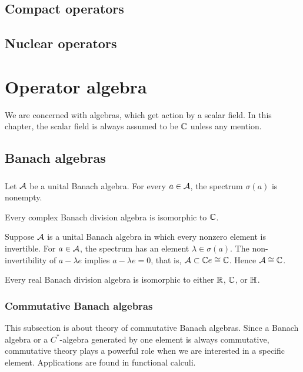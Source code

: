 \documentclass{../crs}
\begin{document}
\section{Compact operators}

\section{Nuclear operators}



\chapter{Operator algebra}
We are concerned with algebras, which get action by a scalar field.
In this chapter, the scalar field is always assumed to be $\mathbb{C}$ unless any mention.

\section{Banach algebras}

\subsection{}

\begin{thm}
Let $\mathcal{A}$ be a unital Banach algebra.
For every $a\in\mathcal{A}$, the spectrum $\sigma(a)$ is nonempty.
\end{thm}
\begin{thm}
Every complex Banach division algebra is isomorphic to $\mathbb{C}$.
\end{thm}
\begin{pf}
Suppose $\mathcal{A}$ is a unital Banach algebra in which every nonzero element is invertible.
For $a\in\mathcal{A}$, the spectrum has an element $\lambda\in\sigma(a)$.
The non-invertibility of $a-\lambda e$ implies $a-\lambda e=0$, that is, $\mathcal{A}\subset\mathbb{C} e\cong\mathbb{C}$.
Hence $\mathcal{A}\cong\mathbb{C}$.
\end{pf}
\begin{thm}
Every real Banach division algebra is isomorphic to either $\mathbb{R}$, $\mathbb{C}$, or $\mathbb{H}$.
\end{thm}


\subsection{Commutative Banach algebras}
This subsection is about theory of commutative Banach algebras.
Since a Banach algebra or a $C^*$-algebra generated by one element is always commutative, commutative theory plays a powerful role when we are interested in a specific element.
Applications are found in functional calculi.
\end{document}
